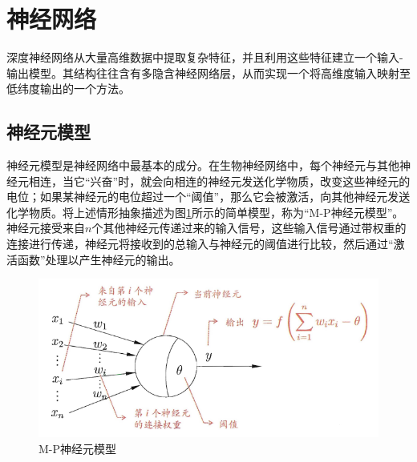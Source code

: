 \documentclass[zihao = -4,cn]{oucart}
\begin{document}
\section{神经网络}
深度神经网络从大量高维数据中提取复杂特征，并且利用这些特征建立一个输入-输出模型。其结构往往含有多隐含神经网络层，从而实现一个将高维度输入映射至低纬度输出的一个方法。

\subsection{神经元模型}
神经元模型是神经网络中最基本的成分。在生物神经网络中，每个神经元与其他神经元相连，当它“兴奋”时，就会向相连的神经元发送化学物质，改变这些神经元的电位；如果某神经元的电位超过一个“阈值”，那么它会被激活，向其他神经元发送化学物质。将上述情形抽象描述为图\ref{fig:unit}所示的简单模型，称为“M-P神经元模型”。神经元接受来自$n$个其他神经元传递过来的输入信号，这些输入信号通过带权重的连接进行传递，神经元将接收到的总输入与神经元的阈值进行比较，然后通过“激活函数”处理以产生神经元的输出。
\begin{figure}[h]
	\centering %
	\includegraphics[scale=0.7]{assets/unit}
	\caption{M-P神经元模型}
	\label{fig:unit}
\end{figure}
\end{document}

